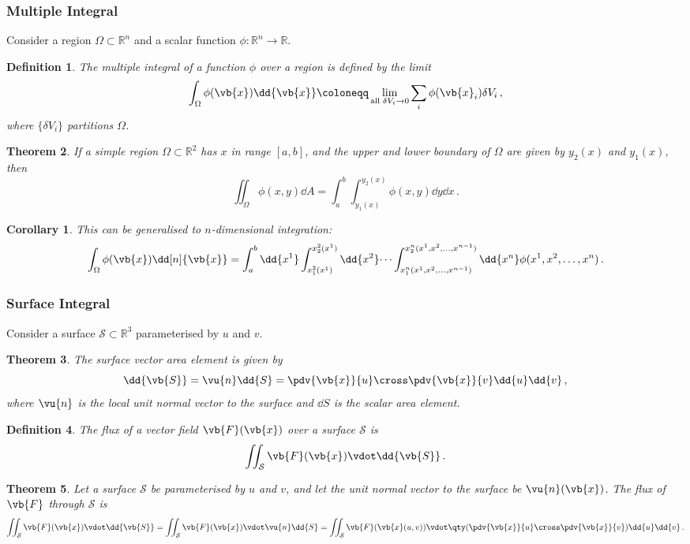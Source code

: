\documentclass{article}
\theoremstyle{plain}\theoremheaderfont{\normalfont\itshape}\theorembodyfont{\rmfamily}\theoremseparator{.}\newtheorem*{rem}{Remark}\newtheorem*{ex}{Example}\newtheorem*{proof}{Proof}\newtheorem*{altp}{Alternative proof}
\theoremstyle{plain}\theoremheaderfont{\normalfont\bfseries}\theorembodyfont{\rmfamily}\theoremseparator{.}\newtheorem{thm}{Theorem}[section]\newtheorem{lem}[thm]{Lemma}\newtheorem{prop}[thm]{Proposition}\newtheorem*{cor}{Corollary}\newtheorem{defn}[thm]{Definition}\newtheorem{clm}[thm]{Claim}\newtheorem{clminproof}{Claim}
\theoremstyle{break}\theoremheaderfont{\normalfont\itshape}\theorembodyfont{\rmfamily}\theoremseparator{.\medskip}\newtheorem*{proofskip}{Proof}\newtheorem*{exs}{Examples}\newtheorem*{rems}{Remarks}
\theoremstyle{break}\theoremheaderfont{\normalfont\bfseries}\theorembodyfont{\rmfamily}\theoremseparator{.\medskip}\newtheorem{lemskip}[thm]{Lemma}\newtheorem{defnskip}[thm]{Definition}\newtheorem{propskip}[thm]{Proposition}\newtheorem{thmskip}[thm]{Theorem}
\numberwithin{equation}{section}
\begin{document}
	\subsubsection{Multiple Integral}
	Consider a region \(\Omega\subset\mathbb{R}^n\) and a scalar function \(\phi:\mathbb{R}^n\to\mathbb{R}\).
	\begin{defn}
		The multiple integral of a function \(\phi\) over a region is defined by the limit
		\[\int_\Omega\phi(\vb{x})\dd{\vb{x}}\coloneqq\lim_{\text{all }\delta V_i\to 0}\sum_i\phi(\vb{x}_i)\delta V_i\,,\]
		where \(\{\delta V_i\}\) partitions \(\Omega\).
	\end{defn}
	\begin{thm}
		If a simple region \(\Omega\subset\mathbb{R}^2\) has \(x\) in range \([a,b]\), and the upper and lower boundary of \(\Omega\) are given by \(y_2(x)\) and \(y_1(x)\), then
		\[\iint_\Omega\phi(x,y)\dd{A}=\int_{a}^{b}\int_{y_1(x)}^{y_2(x)}\phi(x,y)\dd{y}\dd{x}\,.\]
	\end{thm}
	\begin{cor}
		This can be generalised to \(n\)-dimensional integration:
		\[\int_\Omega\phi(\vb{x})\dd[n]{\vb{x}}=\int_{a}^{b}\dd{x^1}\int_{x^2_1(x^1)}^{x^2_2(x^1)}\dd{x^2}\dots\int_{x^n_1(x^1,x^2,\dots,x^{n-1})}^{x^n_2(x^1,x^2,\dots,x^{n-1})}\dd{x^n}\phi(x^1,x^2,\dots,x^n)\,.\]
	\end{cor}
	\subsubsection{Surface Integral}
	Consider a surface \(\mathcal{S}\subset\mathbb{R}^3\) parameterised by \(u\) and \(v\).
	\begin{thm}
		The surface vector area element is given by
		\[\dd{\vb{S}}=\vu{n}\dd{S}=\pdv{\vb{x}}{u}\cross\pdv{\vb{x}}{v}\dd{u}\dd{v}\,,\]
		where \(\vu{n}\) is the local unit normal vector to the surface and \(\dd{S}\) is the scalar area element.
	\end{thm}
	\begin{defn}
		The \textit{flux} of a vector field \(\vb{F}(\vb{x})\) over a surface \(\mathcal{S}\) is
		\[\iint_\mathcal{S}\vb{F}(\vb{x})\vdot\dd{\vb{S}}\,.\]
	\end{defn}
	\begin{thm}
		Let a surface \(\mathcal{S}\) be parameterised by \(u\) and \(v\), and let the unit normal vector to the surface be \(\vu{n}(\vb{x})\). The flux of \(\vb{F}\) through \(\mathcal{S}\) is
		\[\iint_\mathcal{S}\vb{F}(\vb{x})\vdot\dd{\vb{S}}=\iint_\mathcal{S}\vb{F}(\vb{x})\vdot\vu{n}\dd{S}=\iint_\mathcal{S}\vb{F}(\vb{x}(u,v))\vdot\qty(\pdv{\vb{x}}{u}\cross\pdv{\vb{x}}{v})\dd{u}\dd{v}\,.\]
	\end{thm}
\end{document}
